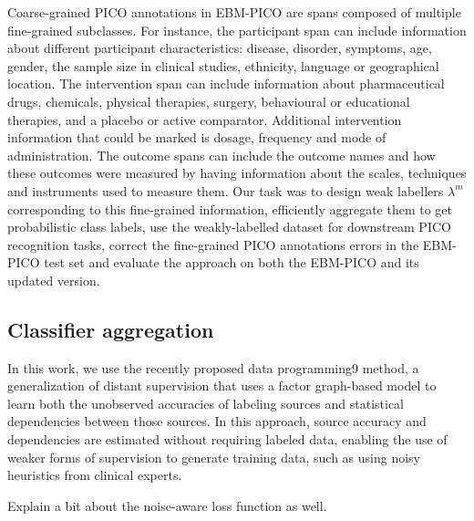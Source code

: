 \documentclass[10.7pt,]{article}
\begin{document}
Coarse-grained PICO annotations in EBM-PICO are spans composed of multiple fine-grained subclasses.
For instance, the participant span can include information about different participant characteristics: disease, disorder, symptoms, age, gender, the sample size in clinical studies, ethnicity, language or geographical location.
The intervention span can include information about pharmaceutical drugs, chemicals, physical therapies, surgery, behavioural or educational therapies, and a placebo or active comparator.
Additional intervention information that could be marked is dosage, frequency and mode of administration.
The outcome spans can include the outcome names and how these outcomes were measured by having information about the scales, techniques and instruments used to measure them.
Our task was to design weak labellers $\lambda^{m}$ corresponding to this fine-grained information, efficiently aggregate them to get probabilistic class labels, use the weakly-labelled dataset for downstream PICO recognition tasks, correct the fine-grained PICO annotations errors in the EBM-PICO test set and evaluate the approach on both the EBM-PICO and its updated version.
%
%
%
\subsection{Classifier aggregation}\label{lms}
%
In this work, we use the recently proposed data programming9 method, a generalization of distant supervision that uses a factor graph-based model to learn both the unobserved accuracies of labeling sources and statistical dependencies between those sources.
In this approach, source accuracy and dependencies are estimated without requiring labeled data, enabling the use of weaker forms of supervision to generate training data, such as using noisy heuristics from clinical experts.

Explain a bit about the noise-aware loss function as well.
%
%
%
\end{document}
